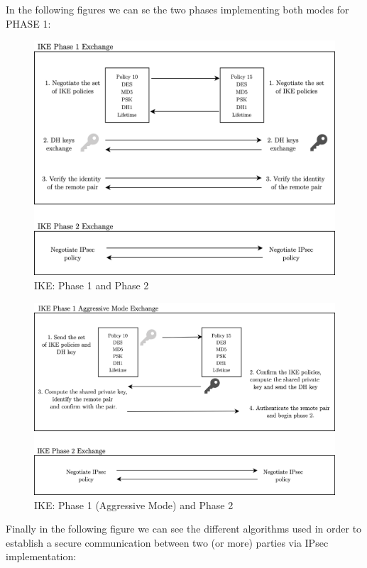 \documentclass[11pt]{book}
\begin{document}
In the following figures we can se the two phases implementing both modes for PHASE 1:
\begin{figure}[H]
	\centering
	\includegraphics [scale=0.19] {main.png}
	\caption{IKE: Phase 1 and Phase 2}
\end{figure}

\begin{figure}[H]
	\centering
	\includegraphics [scale=0.19] {aggressive.png}
	\caption{IKE: Phase 1 (Aggressive Mode) and Phase 2}
\end{figure}

\break

Finally in the following figure we can see the different algorithms used in order to establish a secure communication between two (or more) parties via IPsec implementation:
\end{document}
